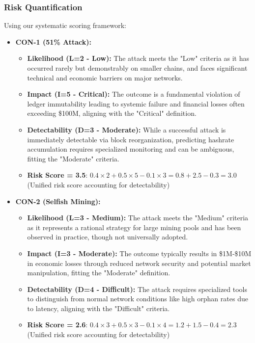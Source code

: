 \subsubsection{Risk Quantification}

Using our systematic scoring framework:

\begin{itemize}
    \item \textbf{CON-1 (51\% Attack):}
    \begin{itemize}
        \item \textbf{Likelihood (L=2 - Low):} The attack meets the "Low" criteria as it has occurred rarely but demonstrably on smaller chains, and faces significant technical and economic barriers on major networks.
        \item \textbf{Impact (I=5 - Critical):} The outcome is a fundamental violation of ledger immutability leading to systemic failure and financial losses often exceeding \$100M, aligning with the "Critical" definition.
        \item \textbf{Detectability (D=3 - Moderate):} While a successful attack is immediately detectable via block reorganization, predicting hashrate accumulation requires specialized monitoring and can be ambiguous, fitting the "Moderate" criteria.
        \item \textbf{Risk Score = 3.5}: $0.4 \times 2 + 0.5 \times 5 - 0.1 \times 3 = 0.8 + 2.5 - 0.3 = 3.0$ (Unified risk score accounting for detectability)
    \end{itemize}
    
    \item \textbf{CON-2 (Selfish Mining):}
    \begin{itemize}
        \item \textbf{Likelihood (L=3 - Medium):} The attack meets the "Medium" criteria as it represents a rational strategy for large mining pools and has been observed in practice, though not universally adopted.
        \item \textbf{Impact (I=3 - Moderate):} The outcome typically results in \$1M-\$10M in economic losses through reduced network security and potential market manipulation, fitting the "Moderate" definition.
        \item \textbf{Detectability (D=4 - Difficult):} The attack requires specialized tools to distinguish from normal network conditions like high orphan rates due to latency, aligning with the "Difficult" criteria.
        \item \textbf{Risk Score = 2.6}: $0.4 \times 3 + 0.5 \times 3 - 0.1 \times 4 = 1.2 + 1.5 - 0.4 = 2.3$ (Unified risk score accounting for detectability)
    \end{itemize}


\end{itemize}

